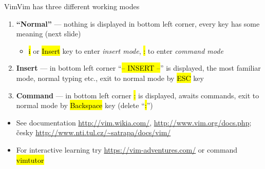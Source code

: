\documentclass[compress, ucs, xelatex, 11pt, xcolor=svgnames,
  hyperref={
    bookmarks=true,
    unicode=true,
    colorlinks=true,
    pdftitle={Linux, command line and MetaCentrum},
    plainpages=false,
    pdfauthor={Vojtech Zeisek},
    pdfsubject={Course about use of Linux command line, writing shell scripts and using MetaCentrum of CESNET},
    pdfcreator={XeLaTeX},
    pdfkeywords={Linux, GNU, BASH, shell, command line, MetaCentrum},
    linkcolor=DarkRed,
    anchorcolor=DarkBlue,
    citecolor=Indigo,
    filecolor=NavyBlue,
    menucolor=DarkMagenta,
    urlcolor=DarkBlue,
    pdftex},
  url={hyphens, lowtilde} %
  ]{beamer}
\renewcommand{\texttt}[1]{\hl{\ttfamily #1}}
\begin{document}
\begin{frame}{Vim}{Vim has three different working modes}
  \begin{enumerate}
    \item \textbf{``Normal''} --- nothing is displayed in bottom left corner, every key has some meaning (next slide)
    \begin{itemize}
      \item \texttt{i} or \texttt{Insert} key to enter \textit{insert mode}, \texttt{:} to enter \textit{command mode}
    \end{itemize}
    \item \textbf{Insert} --- in bottom left corner ``\texttt{-- INSERT --}'' is displayed, the most familiar mode, normal typing etc., exit to normal mode by \texttt{ESC} key
    \item \textbf{Command} --- in bottom left corner \texttt{:} is displayed, awaits commands, exit to normal mode by \texttt{Backspace} key (delete ``\texttt{:}'')
  \end{enumerate}
  \begin{itemize}
    \item See documentation \url{http://vim.wikia.com/}, \url{http://www.vim.org/docs.php}; česky \url{http://www.nti.tul.cz/~satrapa/docs/vim/}
    \item For interactive learning try \url{https://vim-adventures.com/} or command \texttt{vimtutor}
  \end{itemize}
\end{frame}
\end{document}
